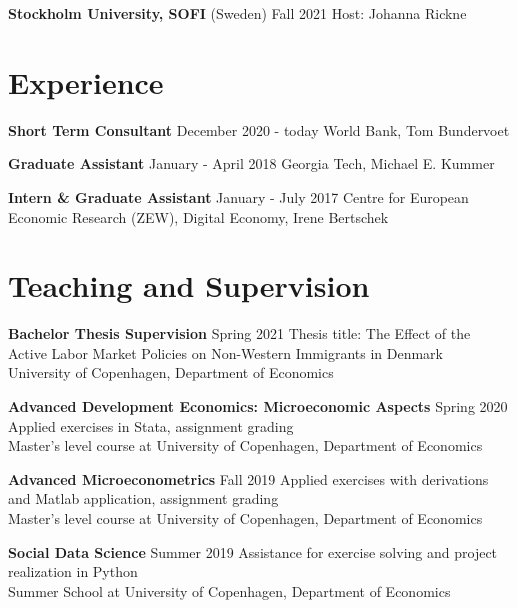 \documentclass[10pt,a4paper]{article}
\begin{document}
\textbf{Stockholm University, SOFI} (Sweden) \hfill Fall 2021 \newline
Host: Johanna Rickne


\section*{Experience}
\textbf{Short Term Consultant} \hfill December 2020 - today\newline
World Bank, Tom Bundervoet
\vspace{1em}

\textbf{Graduate Assistant} \hfill January - April 2018
\newline
Georgia Tech, Michael E. Kummer 
\vspace{1em}

\textbf{Intern \& Graduate Assistant} \hfill January - July 2017
\newline
Centre for European Economic Research (ZEW), Digital Economy, Irene Bertschek

\section*{Teaching and Supervision}
\textbf{Bachelor Thesis Supervision} \hfill Spring 2021
\newline
Thesis title: The Effect of the Active Labor Market Policies on Non-Western Immigrants in Denmark \\
University of Copenhagen, Department of Economics
\vspace{1em}

\textbf{Advanced Development Economics: Microeconomic Aspects} \hfill Spring 2020
\newline
Applied exercises in Stata, assignment grading \\
Master's level course at
University of Copenhagen, Department of Economics
\vspace{1em}

\textbf{Advanced Microeconometrics} \hfill Fall 2019
\newline
Applied exercises with derivations and Matlab application, assignment grading \\
Master's level course at
University of Copenhagen, Department of Economics
\vspace{1em}

\textbf{Social Data Science} \hfill Summer 2019
\newline
Assistance for exercise solving and project realization in Python \\
Summer School at University of Copenhagen, Department of Economics
\vspace{1em}
\end{document}
